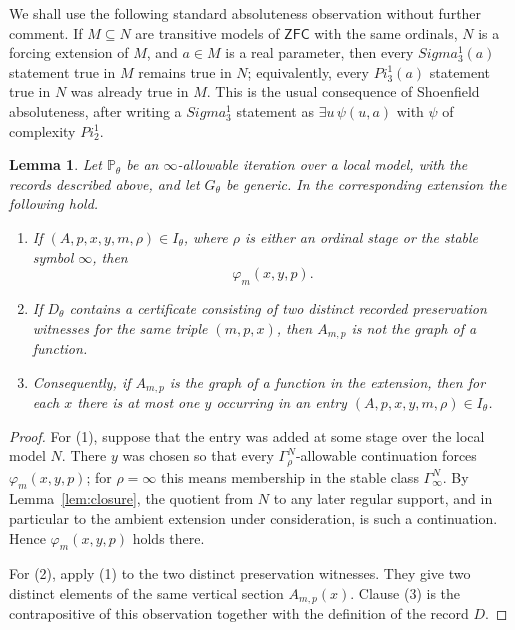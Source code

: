 \documentclass{article}
\newtheorem{lemma}[theorem]{Lemma}
\theoremstyle{remark}
\theoremstyle{plain}
\newcommand{\forceP}{\mathbb{P}}
\newcommand{\ZFC}{\mathsf{ZFC}}
\def\Pi{Pi}%
\def\Sigma{Sigma}%
\begin{document}
We shall use the following standard absoluteness observation without further
comment. If $M\subseteq N$ are transitive models of $\ZFC$ with the same
ordinals, $N$ is a forcing extension of $M$, and $a\in M$ is a real parameter,
then every $\Sigma^1_3(a)$ statement true in $M$ remains true in $N$;
equivalently, every $\Pi^1_3(a)$ statement true in $N$ was already true in $M$.
This is the usual consequence of Shoenfield absoluteness, after writing a
$\Sigma^1_3$ statement as $\exists u\,\psi(u,a)$ with $\psi$ of complexity
$\Pi^1_2$.

\begin{lemma}\label{lem:local-witnesses-for-graphs}
Let $\forceP_\theta$ be an $\infty$-allowable iteration over a local model, with
the records described above, and let $G_\theta$ be generic. In the corresponding
extension the following hold.
\begin{enumerate}[label=\textup{(\arabic*)}]
\item If $(A,p,x,y,m,\rho)\in I_\theta$, where $\rho$ is either an ordinal stage
or the stable symbol $\infty$, then
\[
   \varphi_m(x,y,p).
\]
\item If $D_\theta$ contains a certificate consisting of two distinct recorded
preservation witnesses for the same triple $(m,p,x)$, then $A_{m,p}$ is not the
graph of a function.
\item Consequently, if $A_{m,p}$ is the graph of a function in the extension,
then for each $x$ there is at most one $y$ occurring in an entry
$(A,p,x,y,m,\rho)\in I_\theta$.
\end{enumerate}
\end{lemma}

\begin{proof}
For (1), suppose that the entry was added at some stage over the local model
$N$. There $y$ was chosen so that every $\Gamma^N_\rho$-allowable continuation
forces $\varphi_m(x,y,p)$; for $\rho=\infty$ this means membership in the stable
class $\Gamma^N_\infty$. By Lemma~\ref{lem:closure}, the quotient from $N$ to any
later regular support, and in particular to the ambient extension under
consideration, is such a continuation. Hence $\varphi_m(x,y,p)$ holds there.

For (2), apply (1) to the two distinct preservation witnesses. They give two
distinct elements of the same vertical section $A_{m,p}(x)$. Clause (3) is the
contrapositive of this observation together with the definition of the record
$D$.
\end{proof}
\end{document}
